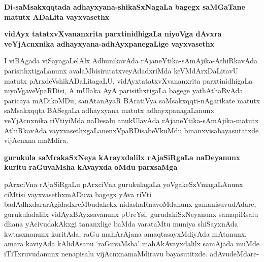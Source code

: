 \textbf{Di-saMsakxqqtada adhayxyana-shikaSxNagaLa bagegx saMGaTane matutx ADaLita vayxvasethx}

\textbf{vidAyx tatatxvXvananxrita parxtinidhigaLa niyoVga dAvxra veYjAcnxnika adhayxyana-adhAyxpanegaLige vayxvasethx}

I viBAgada viSayagaLelAlx AdhunikavAda rAjaneYtika-sAmAjika-AthiRkavAda parisithxtigaLanunx avalaMbisirutatxveyAdadxriMda keVMdArxDaLitavU matutx pArxdeVshikADaLitagaLU, vidAyxtatatxvXvananxrita parxtinidhigaLa niyoVgaveVpaRDisi, A mUlaka AyA parisithxtigaLa bagege yathAthaRvAda paricaya mADikoMDu, sanAtanAyaR BAratiVya saMsakxqqti-nAgarikate matutx saMsakxqqta BASegaLa adhayxyana matutx adhayxpanagaLanunx veYjAcnxnika riVtiyiMda naDesalu anukUlavAda rAjaneYtika-sAmAjika-matutx AthiRkavAda vayxvasethxgaLanenxVpaRDisabeVkuMdu binanxvisabayasutatxde vijAcnxna maMdira.

\textbf{gurukula saMrakaSxNeya kArayxdalilx rAjaSiRgaLa naDeyanunx kuritu raGuvaMsha kAvayxda oMdu parxsaMga}

pArxciVna rAjaSiRgaLu pArxciVna gurukulagaLa yoVgakeSxVmagaLAnunx ciMtisi vayxvasethxmADuva bagegx yAva riVti badAdhxdararAgidadxreMbudakekx nidashaRnavoMdanunx gamanisuvudAdare, gurukuladalilx vidAyxBAyxsavanunx pUreYsi, gurudakiSxNeyanunx samapiRsalu dhana yAcivudakAkxgi tananxlige baMda varataMtu
muniya shiSayxnAda kwtasxnanunx kuritAda, raGu mahArAjana amaqtasayxMdiyAda mAtanunx, amara kaviyAda kAlidAsanu `raGuvaMsha' mahAkAvayxdalilx samAjada muMde iTiTxruvudanunx nenapisalu vijAcnxnamaMdiravu bayasutitxde. adAvudeMdare-

